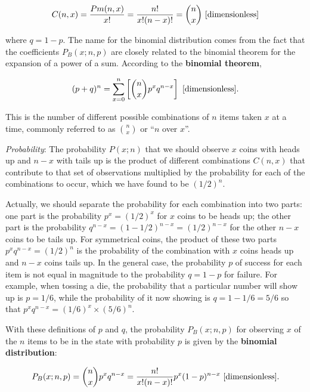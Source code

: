 \documentclass[a4paper,10pt]{article}
\begin{document}
\begin{align*}
    C(n,x) = \frac{Pm(n,x)}{x!} = \frac{n!}{x!(n-x)!} = \binom{n}{x} ~ [{\rm dimensionless}]
\end{align*}

{\noindent}where $q=1-p$. The name for the binomial distribution comes from the fact that the coefficients $P_B(x;n,p)$ are closely related to the binomial theorem for the expansion of a power of a sum. According to the \textbf{binomial theorem},

\begin{align*}
    (p+q)^n = \sum _{x=0}^n \left[ \binom{n}{x}p^xq^{n-x} \right] ~ [{\rm dimensionless}].
\end{align*}

{\noindent}This is the number of different possible combinations of $n$ items taken $x$ at a time, commonly referred to as $\binom{n}{x}$ or ``$n$ over $x$''.

{\noindent}\textit{Probability}: The probability $P(x;n)$ that we should observe $x$ coins with heads up and $n-x$ with tails up is the product of different combinations $C(n,x)$ that contribute to that set of observations multiplied by the probability for each of the combinations to occur, which we have found to be $(1/2)^n$.

{\noindent}Actually, we should separate the probability for each combination into two parts: one part is the probability $p^x=(1/2)^x$ for $x$ coins to be heads up; the other part is the probability $q^{n-x} = (1-1/2)^{n-x} = (1/2)^{n-x}$ for the other $n-x$ coins to be tails up. For symmetrical coins, the product of these two parts $p^xq^{n-x}=(1/2)^n$ is the probability of the combination with $x$ coins heads up and $n-x$ coins tails up. In the general case, the probability $p$ of success for each item is not equal in magnitude to the probability $q=1-p$ for failure. For example, when tossing a die, the probability that a particular number will show up is $p=1/6$, while the probability of it now showing is $q=1-1/6=5/6$ so that $p^xq^{n-x}=(1/6)^x\times(5/6)^n$.

{\noindent}With these definitions of $p$ and $q$, the probability $P_B(x;n,p)$ for observing $x$ of the $n$ items to be in the state with probability $p$ is given by the \textbf{binomial distribution}:

\begin{align*}
    P_B(x;n,p) = \binom{n}{x}p^xq^{n-x} = \frac{n!}{x!(n-x)!}p^x(1-p)^{n-x} ~ [{\rm dimensionless}].
\end{align*}
\end{document}
